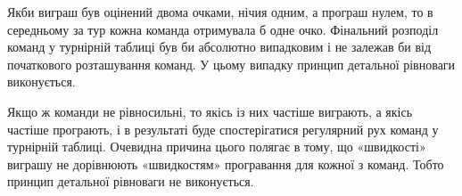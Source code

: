 Якби виграш був оцінений двома очками, нічия одним, а програш нулем, то в середньому за тур кожна команда отримувала б одне очко. Фінальний розподіл команд у турнірній таблиці був би абсолютно випадковим і не залежав би від початкового розташування команд. У цьому випадку принцип детальної рівноваги виконується.

Якщо ж команди не рівносильні, то якісь із них частіше виграють, а якісь частіше програють, і в результаті буде спостерігатися регулярний рух команд у турнірній таблиці. Очевидна причина цього полягає в тому, що «швидкості» виграшу не дорівнюють «швидкостям» програвання для кожної з команд. Тобто принцип детальної рівноваги не виконується.



